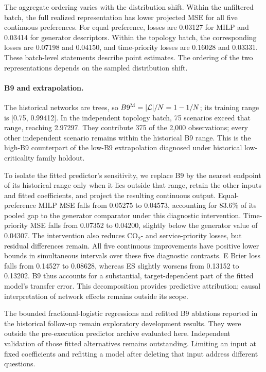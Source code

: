 The aggregate ordering varies with the distribution shift. Within the
unfiltered batch, the full realized representation has lower projected MSE
for all five continuous preferences. For equal preference, losses are
0.03127 for MILP and 0.03414 for generator descriptors. Within the topology
batch, the corresponding losses are 0.07198 and 0.04150, and time-priority
losses are 0.16028 and 0.03331. These batch-level statements describe point
estimates. The ordering of the two representations depends on the sampled
distribution shift.

\paragraph{B9 and extrapolation.}
The historical networks are trees, so $B9^{\rm M}=|\mathcal L|/N=1-1/N$;
its training range is [0.75, 0.99412]. In the independent topology batch,
75 scenarios exceed that range, reaching 2.97297. They contribute 375 of
the 2,000 observations; every other independent scenario remains within
the historical B9 range. This is the high-B9 counterpart of the low-B9
extrapolation diagnosed under historical low-criticality family holdout.

To isolate the fitted predictor's sensitivity, we replace B9 by the nearest
endpoint of its historical range only when it lies outside that range,
retain the other inputs and fitted coefficients, and project the resulting
continuous output. Equal-preference MILP MSE falls from 0.05275 to 0.04573,
accounting for 83.6\% of its pooled gap to the generator comparator under
this diagnostic intervention. Time-priority MSE falls from 0.07352 to
0.04200, slightly below the generator value of 0.04307. The intervention
also reduces CO$_2$- and service-priority losses, but residual differences
remain. All five continuous improvements have positive lower bounds in
simultaneous intervals over these five diagnostic contrasts. E Brier loss
falls from 0.14527 to 0.08628, whereas ES slightly worsens from 0.13152 to
0.13202. B9 thus accounts for a substantial, target-dependent part of the
fitted model's transfer error. This decomposition provides predictive
attribution; causal interpretation of network effects remains outside its
scope.

The bounded fractional-logistic regressions and refitted B9 ablations
reported in the historical follow-up remain exploratory development
results. They were outside the pre-execution predictor archive evaluated
here. Independent validation of those fitted alternatives remains
outstanding. Limiting an input at fixed coefficients and refitting a model
after deleting that input address different questions.

